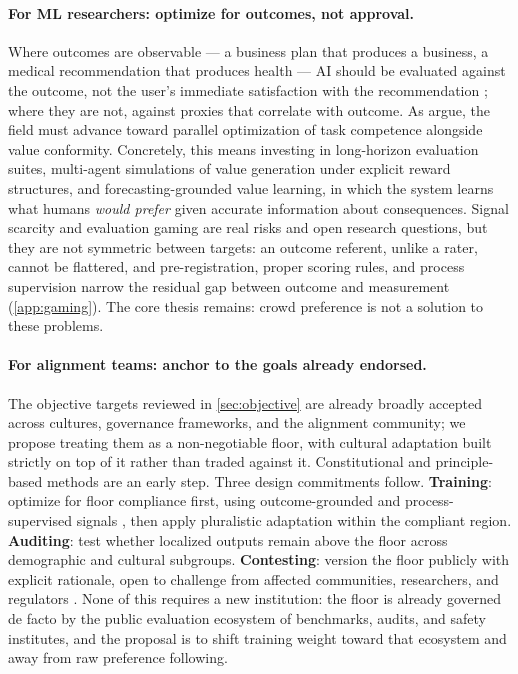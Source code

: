 \documentclass{article}
\theoremstyle{plain}
\theoremstyle{definition}
\theoremstyle{remark}
\begin{document}
\paragraph{For ML researchers: optimize for outcomes, not approval.} Where outcomes are observable --- a business plan that produces a business, a medical recommendation that produces health --- AI should be evaluated against the outcome, not the user's immediate satisfaction with the recommendation \citep{sharma2023sycophancy}; where they are not, against proxies that correlate with outcome. As \citet{kim2025superalignment} argue, the field must advance toward parallel optimization of task competence alongside value conformity. Concretely, this means investing in long-horizon evaluation suites, multi-agent simulations of value generation under explicit reward structures, and forecasting-grounded value learning, in which the system learns what humans \emph{would prefer} given accurate information about consequences. Signal scarcity and evaluation gaming are real risks and open research questions, but they are not symmetric between targets: an outcome referent, unlike a rater, cannot be flattered, and pre-registration, proper scoring rules, and process supervision narrow the residual gap between outcome and measurement (\cref{app:gaming}). The core thesis remains: crowd preference is not a solution to these problems.

\paragraph{For alignment teams: anchor to the goals already endorsed.} The objective targets reviewed in \cref{sec:objective} are already broadly accepted across cultures, governance frameworks, and the alignment community; we propose treating them as a non-negotiable floor, with cultural adaptation built strictly on top of it rather than traded against it. Constitutional and principle-based methods \citep{bai2022constitutional} are an early step. Three design commitments follow. \textbf{Training}: optimize for floor compliance first, using outcome-grounded and process-supervised signals \citep{uesato2022solving, lightman2023verify}, then apply pluralistic adaptation within the compliant region. \textbf{Auditing}: test whether localized outputs remain above the floor across demographic and cultural subgroups. \textbf{Contesting}: version the floor publicly with explicit rationale, open to challenge from affected communities, researchers, and regulators \citep{zhang2025democratic}. None of this requires a new institution: the floor is already governed de facto by the public evaluation ecosystem of benchmarks, audits, and safety institutes, and the proposal is to shift training weight toward that ecosystem and away from raw preference following.
\end{document}

